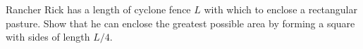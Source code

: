 Rancher Rick has a length of cyclone fence $L$ with which to enclose a rectangular pasture.
Show that he can enclose the greatest possible area by forming a square with sides of length $L/4$.
